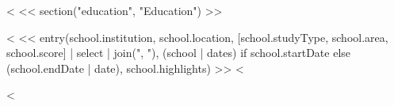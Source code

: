 <%
<< section("education", "Education") >>
\begin{description}
<%
<< entry(school.institution, school.location, [school.studyType, school.area, school.score] | select | join(", "), (school | dates) if school.startDate else (school.endDate | date), school.highlights) >>
<%
\end{description}

<%
